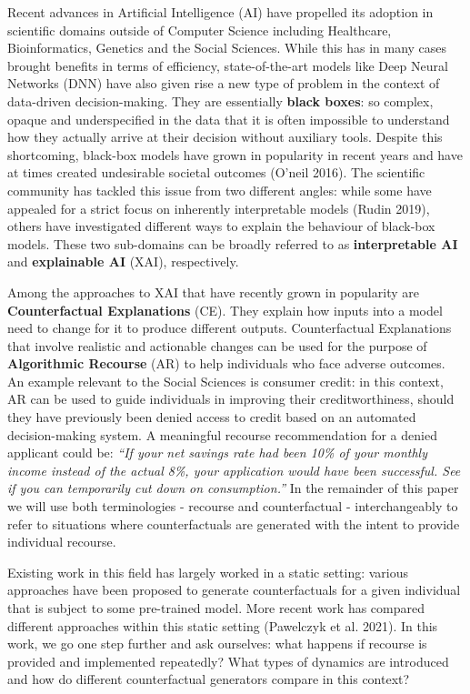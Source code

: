 \documentclass[conference,final,]{IEEEtran}
\begin{document}
Recent advances in Artificial Intelligence (AI) have propelled its adoption in scientific domains outside of Computer Science including Healthcare, Bioinformatics, Genetics and the Social Sciences. While this has in many cases brought benefits in terms of efficiency, state-of-the-art models like Deep Neural Networks (DNN) have also given rise a new type of problem in the context of data-driven decision-making. They are essentially \textbf{black boxes}: so complex, opaque and underspecified in the data that it is often impossible to understand how they actually arrive at their decision without auxiliary tools. Despite this shortcoming, black-box models have grown in popularity in recent years and have at times created undesirable societal outcomes (O'neil 2016). The scientific community has tackled this issue from two different angles: while some have appealed for a strict focus on inherently interpretable models (Rudin 2019), others have investigated different ways to explain the behaviour of black-box models. These two sub-domains can be broadly referred to as \textbf{interpretable AI} and \textbf{explainable AI} (XAI), respectively.

Among the approaches to XAI that have recently grown in popularity are \textbf{Counterfactual Explanations} (CE). They explain how inputs into a model need to change for it to produce different outputs. Counterfactual Explanations that involve realistic and actionable changes can be used for the purpose of \textbf{Algorithmic Recourse} (AR) to help individuals who face adverse outcomes. An example relevant to the Social Sciences is consumer credit: in this context, AR can be used to guide individuals in improving their creditworthiness, should they have previously been denied access to credit based on an automated decision-making system. A meaningful recourse recommendation for a denied applicant could be: \emph{``If your net savings rate had been 10\% of your monthly income instead of the actual 8\%, your application would have been successful. See if you can temporarily cut down on consumption.''} In the remainder of this paper we will use both terminologies - recourse and counterfactual - interchangeably to refer to situations where counterfactuals are generated with the intent to provide individual recourse.

Existing work in this field has largely worked in a static setting: various approaches have been proposed to generate counterfactuals for a given individual that is subject to some pre-trained model. More recent work has compared different approaches within this static setting (Pawelczyk et al. 2021). In this work, we go one step further and ask ourselves: what happens if recourse is provided and implemented repeatedly? What types of dynamics are introduced and how do different counterfactual generators compare in this context?
\end{document}
